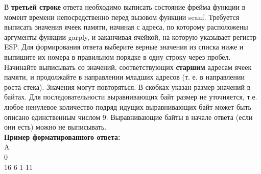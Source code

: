 \documentclass[12pt, letterpaper]{article}
\begin{document}
В \textbf{третьей строке} ответа необходимо выписать состояние фрейма функции в момент времени непосредственно перед вызовом функции scanf. Требуется выписать значения ячеек памяти, начиная с адреса, по которому расположены аргументы функции garply, и заканчивая ячейкой, на которую указывает регистр ESP. Для формирования ответа выберите верные значения из списка ниже и выпишите их номера в правильном порядке в одну строку через пробел. Начинайте выписывать со значений, соответствующих \textbf{старшим} адресам ячеек памяти, и продолжайте в направлении младших адресов (т. е. в направлении роста стека). Значения могут повторяться. В скобках указан размер значений в байтах. Для последовательности выравнивающих байт размер не уточняется, т.е. любое ненулевое количество подряд идущих выравнивающих байт может быть описано единственным числом 9. Выравнивающие байты в начале ответа (если они есть) можно не выписывать.\\

\textbf{Пример форматированного ответа:}\\
A\\
0\\
16 6 1 11\\
\begin{center}
\end{center}
\vspace{2cm}
\end{document}

